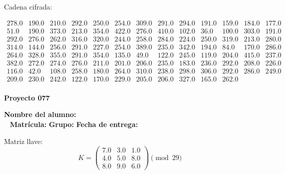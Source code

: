 \documentclass[12pt]{article}
\begin{document}
Cadena cifrada:
\begin{center}
$\begin{array}{lllllllllllll}
278.0 & 190.0 & 210.0 & 292.0 & 250.0 & 254.0 & 309.0 & 291.0 & 294.0 & 191.0 & 159.0 & 184.0 & 177.0\\
51.0 & 190.0 & 373.0 & 213.0 & 354.0 & 422.0 & 276.0 & 410.0 & 102.0 & 36.0 & 100.0 & 303.0 & 191.0\\
292.0 & 276.0 & 262.0 & 316.0 & 320.0 & 244.0 & 258.0 & 284.0 & 224.0 & 250.0 & 319.0 & 213.0 & 280.0\\
314.0 & 144.0 & 256.0 & 291.0 & 227.0 & 254.0 & 389.0 & 235.0 & 342.0 & 194.0 & 84.0 & 170.0 & 286.0\\
264.0 & 328.0 & 355.0 & 291.0 & 354.0 & 135.0 & 49.0 & 122.0 & 245.0 & 119.0 & 204.0 & 415.0 & 237.0\\
382.0 & 272.0 & 274.0 & 276.0 & 211.0 & 201.0 & 206.0 & 235.0 & 183.0 & 236.0 & 292.0 & 208.0 & 226.0\\
116.0 & 42.0 & 108.0 & 258.0 & 180.0 & 264.0 & 310.0 & 238.0 & 298.0 & 306.0 & 292.0 & 286.0 & 249.0\\
209.0 & 230.0 & 242.0 & 122.0 & 170.0 & 229.0 & 205.0 & 206.0 & 327.0 & 165.0 & 262.0\\
\end{array}$
\end{center}

\newpage


\textbf{Proyecto 077}

\textbf{Nombre del alumno:} \underline{\hspace{13cm}}\\\
\vspace{1cm}
\textbf{Matrícula:} \underline{\hspace{4cm}} \hspace{1cm}
\textbf{Grupo:} \underline{\hspace{2cm}}
\textbf{Fecha de entrega:} \underline{\hspace{2cm}}

\medskip

Matriz llave:
\[
K = \begin{pmatrix}
7.0 & 3.0 & 1.0\\
4.0 & 5.0 & 8.0\\
8.0 & 9.0 & 6.0
\end{pmatrix} \pmod{29}
\]
\end{document}
